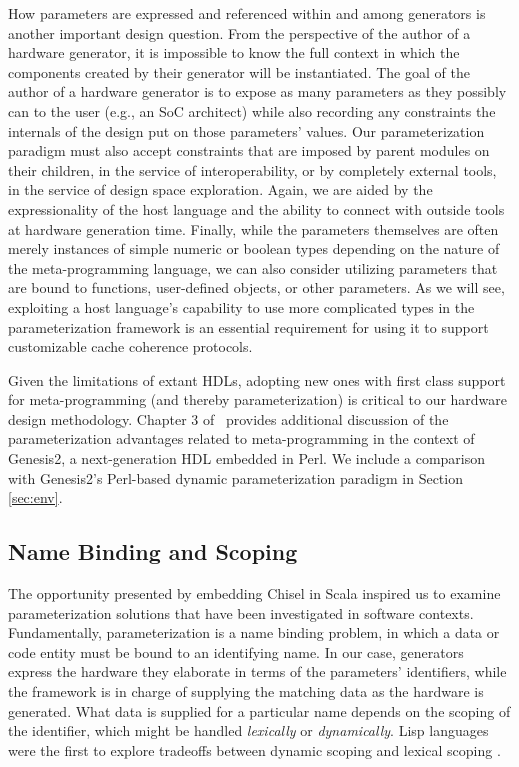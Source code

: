 How parameters are expressed and referenced within and among generators is another important design question.
From the perspective of the author of a hardware generator, it is impossible to know the full context in which the components created by their generator will be instantiated.
The goal of the author of a hardware generator is to expose as many parameters as they possibly can to the user (e.g., an SoC architect)
while also recording any constraints the internals of the design put on those parameters' values.
Our parameterization paradigm must also accept constraints that are imposed by parent modules on their children, in the service of interoperability,
or by completely external tools, in the service of design space exploration.
Again, we are aided by the expressionality of the host language and the ability to connect with outside tools at hardware generation time.
Finally, while the parameters themselves are often merely instances of simple numeric or boolean types
depending on the nature of the meta-programming language,
we can also consider utilizing parameters that are bound to functions, user-defined objects, or other parameters.
As we will see, exploiting a host language's capability to use more complicated types in the parameterization framework
is an essential requirement for using it to support customizable cache coherence protocols.

Given the limitations of extant HDLs, adopting new ones with first class support for meta-programming (and thereby parameterization)
is critical to our hardware design methodology.
Chapter 3 of~\cite{shacham2011chip} provides additional discussion of the 
parameterization advantages related to meta-programming
in the context of Genesis2, a next-generation HDL embedded in Perl.
We include a comparison with Genesis2's Perl-based dynamic parameterization paradigm in Section \ref{sec:env}.

\subsection{Name Binding and Scoping}

The opportunity presented by embedding Chisel in Scala inspired us to examine parameterization solutions that have been investigated in software contexts.
Fundamentally, parameterization is a name binding problem, in which a data or code entity must be bound to an identifying name.
In our case, generators express the hardware they elaborate in terms of the parameters' identifiers,
while the framework is in charge of supplying the matching data as the hardware is generated.
What data is supplied for a particular name depends on the scoping of the identifier, which might be handled \emph{lexically} or \emph{dynamically}.
Lisp languages were the first to explore tradeoffs between dynamic scoping and lexical scoping \cite{gordon}.

